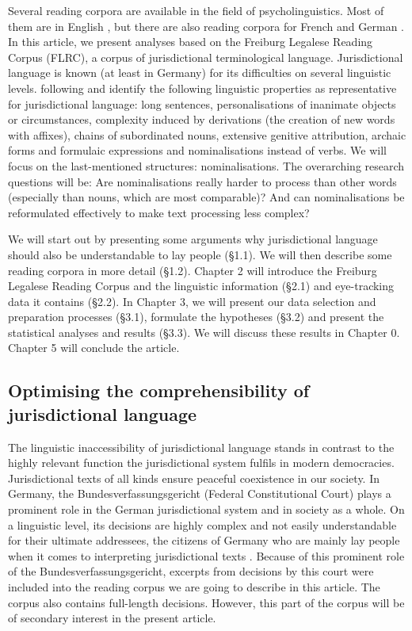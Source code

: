 \documentclass[output=paper]{langsci/langscibook}
\begin{document}
Several reading corpora are available in the field of psycholinguistics. Most of them are in English \citep{Frank2013, Kennedy2003}, but there are also reading corpora for French \citep{Kennedy2003} and German \citep{Kliegl2004, wolfer2013}. In this article, we present analyses based on the Freiburg Legalese Reading Corpus (FLRC), a corpus of jurisdictional terminological language. Jurisdictional language is known (at least in Germany) for its difficulties on several linguistic levels. \citet[p. 170]{HansenSchirra2004} following \citet{Oksaar1988} and \citet{Wagner1981} identify the following linguistic properties as representative for jurisdictional language: long sentences, personalisations of inanimate objects or circumstances, complexity induced by derivations (the creation of new words with affixes), chains of subordinated nouns, extensive genitive attribution, archaic forms and formulaic expressions and nominalisations instead of verbs. We will focus on the last-mentioned structures: nominalisations. The overarching research questions will be: Are nominalisations really harder to process than other words (especially than nouns, which are most comparable)? And can nominalisations be reformulated effectively to make text processing less complex?

We will start out by presenting some arguments why jurisdictional language should also be understandable to lay people (§1.1). We will then describe some reading corpora in more detail (§1.2). Chapter 2 will introduce the Freiburg Legalese Reading Corpus and the linguistic information (§2.1) and eye-tracking data it contains (§2.2). In Chapter 3, we will present our data selection and preparation processes (§3.1), formulate the hypotheses (§3.2) and present the statistical analyses and results (§3.3). We will discuss these results in Chapter 0. Chapter 5 will conclude the article.

\subsection{\label{bkm:Ref283725774}Optimising the comprehensibility of jurisdictional language}

The linguistic inaccessibility of jurisdictional language stands in contrast to the highly relevant function the jurisdictional system fulfils in modern democracies. Jurisdictional texts of all kinds ensure peaceful coexistence in our society. In Germany, the Bundesverfassungsgericht (Federal Constitutional Court) plays a prominent role in the German jurisdictional system and in society as a whole. On a linguistic level, its decisions are highly complex and not easily understandable for their ultimate addressees, the citizens of Germany who are mainly lay people when it comes to interpreting jurisdictional texts \citep[cf. ][]{eichhoff2009denken}. Because of this prominent role of the Bundesverfassungsgericht, excerpts from decisions by this court were included into the reading corpus we are going to describe in this article. The corpus also contains full-length decisions. However, this part of the corpus will be of secondary interest in the present article. 
\end{document}
